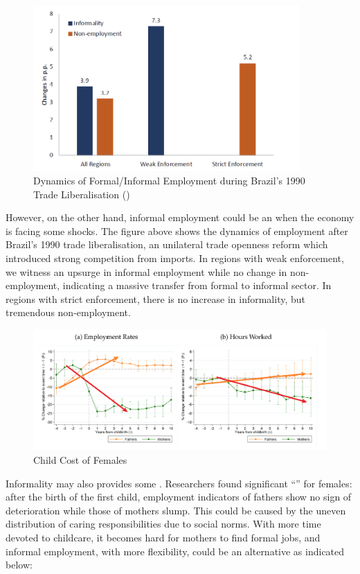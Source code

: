             \begin{figure}[H]
                \centering
                \includegraphics[width=4in]{images/ch6/employment brazil 1990 lib.png}
                \caption{Dynamics of Formal/Informal Employment during Brazil's 1990 Trade Liberalisation (\cite{ponczek_enforcement_2022})}
            \end{figure}
            However, on the other hand, informal employment could be an  when the economy is facing some shocks. The figure above shows the dynamics of employment after Brazil's 1990 trade liberalisation, an unilateral trade openness reform which introduced strong competition from imports. In regions with weak enforcement, we witness an upsurge in informal employment while no change in non-employment, indicating a massive transfer from formal to informal sector. In regions with strict enforcement, there is no increase in informality, but tremendous non-employment.
            \begin{figure}[H]
                \centering
                \includegraphics[width=5.5in]{images/ch6/child cost of females.png}
                \caption{Child Cost of Females}
            \end{figure}
            Informality may also provides some . Researchers found significant ``'' for females: after the birth of the first child, employment indicators of fathers show no sign of deterioration while those of mothers slump. This could be caused by the uneven distribution of caring responsibilities due to social norms. With more time devoted to childcare, it becomes hard for mothers to find formal jobs, and informal employment, with more flexibility, could be an alternative as indicated below:
